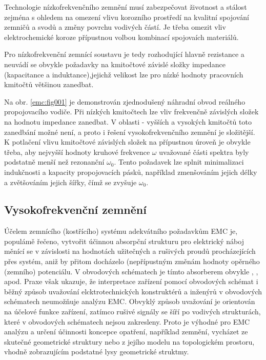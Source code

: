       Technologie nízkofrekvenčního zemnění musí zabezpečovat životnost a stálost zejména s ohledem
      na omezení vlivu korozního prostředí na kvalitní spojování zemničů a svodů a změny povrchu
      vodivých částí. Je třeba omezit vliv elektrochemické koroze přípustnou volbou kombinací
      spojovaích materiálů. 

      Pro nízkofrekvenční zemnící soustavu je tedy rozhodující hlavně rezistance a neuvádí se
      obvykle požadavky na kmitočtové závislé složky impedance (kapacitance a induktance),jejichž
      velikost lze pro nízké hodnoty pracovních kmitočtů většinou zanedbat. 

      Na obr. \ref{emc:fig001} je demonstrován zjednodušený náhradní obvod reálného propojovacího
      vodiče. Při nízkých kmitočtech lze vliv frekvenčně závislých složek na hodnotu impedance
      zanedbat. V oblasti - vyšších a vysokých kmitočtů toto zanedbání možné není, a proto i řešení
      vysokofrekvenčního zemnění je složitější. K potlačení vlivu kmitočtové závislých složek na
      přípustnou úroveň je obvykle třeba, aby nejvyšší hodnoty kruhové frekvence \(\omega\)
      uvažované části spektra byly podstatně menší než rezonanční \(\omega_0\). Tento požadavek lze
      splnit minimalizaci indukčnosti a kapacity propojovacích pásků, například zmenšováním jejich
      délky a zvětšováním jejich šířky, čímž se zvyšuje \(\omega_0\).

    \subsection{Vysokofrekvenční zemnění}\label{emc:IchapIIIsecIssecII}
      
      Účelem zemnícího (kostřícího) systému adekvátního požadavkům EMC je, populámě řečeno, vytvořit
      účinnou absorpční strukturu pro elektrický náboj měnící se v závislosti na hodnotách
      užitečných a rušivých proudů procházejících přes systém, aniž by přitom docházelo
      (nepřípustným změnám hodnoty opěrného (zemního) potenciálu. V obvodových schématech je tímto
      absorberem obvykle \emph{}, \emph{}, \emph{} apod.
      Praxe však ukazuje, že interpretace zařízení pomocí obvodových schémat i běžný způsob
      uvažování elcktrotechnických konstruktérů a inženýrů v obvodových schématech neumožňuje
      analýzu EMC. Obvyklý způsob uvažování je orientován na účelové funkce zařízení, zatímco rušivé
      signály se šíří po vodivých strukturách, které v obvodových schématech nejsou zakresleny.
      Proto je výhodné pro EMC analýzu a určení účinnosti koncepce opatření, například zemnění,
      vycházet ze skutečné geometrické struktury nebo z jejího modelu na topologickém prostoru,
      vhodně zobrazujícím podstatné lysy geometrické struktmy. 
      
